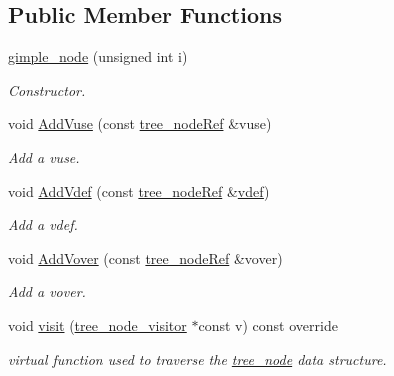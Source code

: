 \subsection*{Public Member Functions}
\begin{DoxyCompactItemize}
\item 
\hyperlink{structgimple__node_ab09799f973c1c2bc15ad2cdcd0913a2d}{gimple\+\_\+node} (unsigned int i)
\begin{DoxyCompactList}\small\item\em Constructor. \end{DoxyCompactList}\item 
void \hyperlink{structgimple__node_a6f29a0d5137eb6deca64f1f8bcf938e9}{Add\+Vuse} (const \hyperlink{tree__node_8hpp_a6ee377554d1c4871ad66a337eaa67fd5}{tree\+\_\+node\+Ref} \&vuse)
\begin{DoxyCompactList}\small\item\em Add a vuse. \end{DoxyCompactList}\item 
void \hyperlink{structgimple__node_a61c41eb0bc02d730e9dbd92a23e5ab86}{Add\+Vdef} (const \hyperlink{tree__node_8hpp_a6ee377554d1c4871ad66a337eaa67fd5}{tree\+\_\+node\+Ref} \&\hyperlink{structgimple__node_ac3e8056bd58becfd11f356427352b6fa}{vdef})
\begin{DoxyCompactList}\small\item\em Add a vdef. \end{DoxyCompactList}\item 
void \hyperlink{structgimple__node_af12362bd30c5aecd4901183e99e745b5}{Add\+Vover} (const \hyperlink{tree__node_8hpp_a6ee377554d1c4871ad66a337eaa67fd5}{tree\+\_\+node\+Ref} \&vover)
\begin{DoxyCompactList}\small\item\em Add a vover. \end{DoxyCompactList}\item 
void \hyperlink{structgimple__node_a337b029a3aca9c1b96311b6e6668f7f3}{visit} (\hyperlink{classtree__node__visitor}{tree\+\_\+node\+\_\+visitor} $\ast$const v) const override
\begin{DoxyCompactList}\small\item\em virtual function used to traverse the \hyperlink{classtree__node}{tree\+\_\+node} data structure. \end{DoxyCompactList}\end{DoxyCompactItemize}
